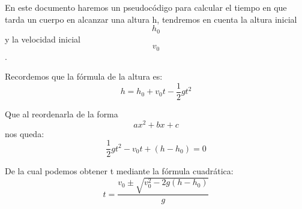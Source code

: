 \documentclass{article}
\begin{document}
En este documento haremos un pseudocódigo para calcular el tiempo en que tarda un cuerpo
en alcanzar una altura h, tendremos en cuenta la altura inicial \[h_0\] y la velocidad inicial \[v_0\].

Recordemos que la fórmula de la altura es:
\[
h = h_0 + v_0t - \frac{1}{2}gt^2
\]

Que al reordenarla de la forma \[ax^2 + bx + c\] nos queda:
\[
\frac{1}{2}gt^2 - v_0t + (h-h_0) = 0
\]

De la cual podemos obtener t mediante la fórmula cuadrática:
\[
t = \frac{v_0 \pm \sqrt{v_0^2 - 2g(h-h_0)}}{g}
\]
\end{document}

